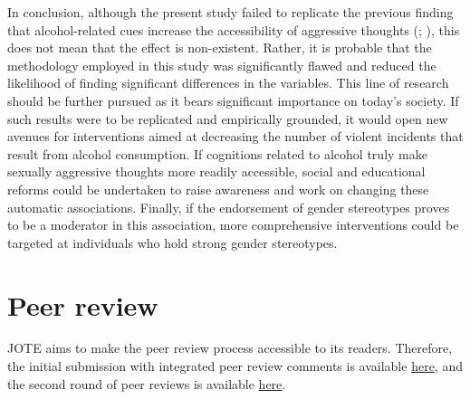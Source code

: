\documentclass[serif, twocolumn, numeric, empirical]{jote-article}
\begin{document}
In conclusion, although the present study failed to replicate the previous finding that alcohol-related cues increase the accessibility of aggressive thoughts (\cite{BartholowHeinz2006}; \cite{SubraMullerBegueLBushmanDelmas2010}), this does not mean that the effect is non-existent. Rather, it is probable that the methodology employed in this study was significantly flawed and reduced the likelihood of finding significant differences in the variables. This line of research should be further pursued as it bears significant importance on today’s society. If such results were to be replicated and empirically grounded, it would open new avenues for interventions aimed at decreasing the number of violent incidents that result from alcohol consumption. If cognitions related to alcohol truly make sexually aggressive thoughts more readily accessible, social and educational reforms could be undertaken to raise awareness and work on changing these automatic associations. Finally, if the endorsement of gender stereotypes proves to be a moderator in this association, more comprehensive interventions could be targeted at individuals who hold strong gender stereotypes.

{}
\section*{Peer review} 

JOTE aims to make the peer review process accessible to its readers. Therefore, the initial submission with integrated peer review comments is available \href{https://doi.org/10.36850/e1.pr1}{here}, and the second round of peer reviews is available \href{https://doi.org/10.36850/e1.pr2}{here}.

\setlength{\bibhang}{\parindent}
\nocite{*} 
{}
\printbibliography



\end{document}
